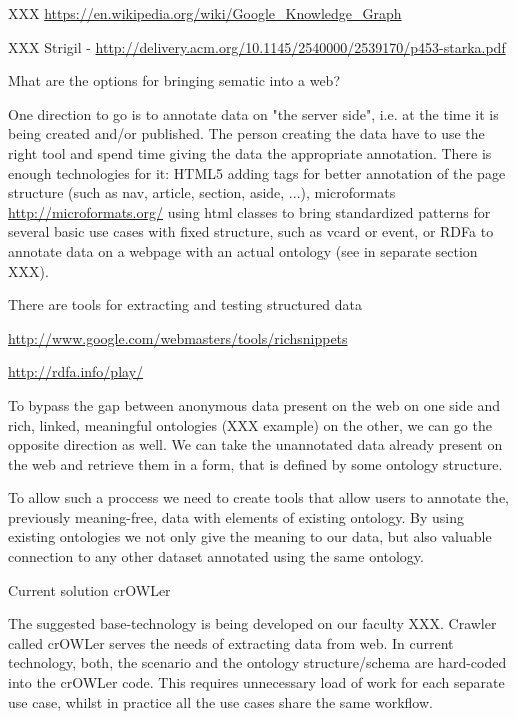 XXX \url{https://en.wikipedia.org/wiki/Google_Knowledge_Graph}

XXX Strigil - \url{http://delivery.acm.org/10.1145/2540000/2539170/p453-starka.pdf}

Mhat are the options for bringing sematic into a web? 


One direction to go is to annotate data on "the server side", i.e. at the time
it is being created and/or published. The person creating the data have to use
the right tool and spend time giving the data the appropriate annotation. There
is enough technologies for it: HTML5 adding tags for better annotation of the
page structure (such as nav, article, section, aside, ...), microformats
\url{http://microformats.org/} using html classes to bring standardized
patterns for several basic use cases with fixed structure, such as vcard or
event, or RDFa to annotate data on a webpage with an actual ontology (see in
separate section XXX).

There are tools for extracting and testing structured data 

\url{http://www.google.com/webmasters/tools/richsnippets}

\url{http://rdfa.info/play/}

To bypass the gap between anonymous data present on the web on one side and
rich, linked, meaningful ontologies (XXX example) on the other, we can go the
opposite direction as well. We can take the unannotated data already present on
the web and retrieve them in a form, that is defined by some ontology
structure. 

To allow such a proccess we need to create tools that allow users to annotate
the, previously meaning-free, data with elements of existing ontology. By using
existing ontologies we not only give the meaning to our data, but also valuable
connection to any other dataset annotated using the same ontology. 


\sec Current solution crOWLer

The suggested base-technology is being developed on our faculty XXX. Crawler
called crOWLer serves the needs of extracting data from web. In current
technology, both, the scenario and the ontology structure/schema are hard-coded
into the crOWLer code. This requires unnecessary load of work for each separate
use case, whilst in practice all the use cases share the same workflow. 

